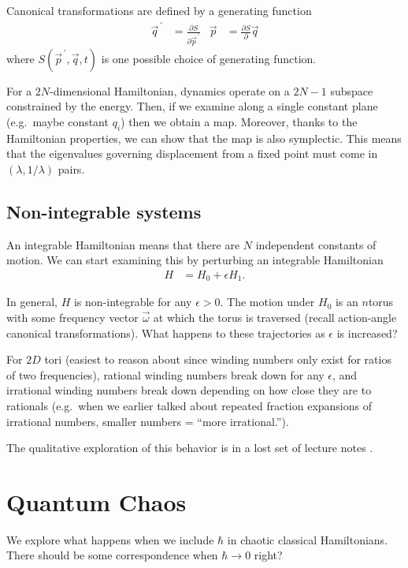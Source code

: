 \documentclass[12pt]{article}
\newcommand{\pd}[2]{\frac{\partial#1}{\partial#2}}
\newcommand{\pvec}[1]{\vec{#1}^{\,\prime}}
\begin{document}
Canonical transformations are defined by a generating function
\begin{align}
    \pvec{q} &= \pd{S}{\pvec{p}}& \vec{p} &= \pd{S}{}\vec{q}
\end{align}
where $S(\pvec{p}, \vec{q}, t)$ is one possible choice of generating function.

For a $2N$-dimensional Hamiltonian, dynamics operate on a $2N-1$ subspace
constrained by the energy. Then, if we examine along a single constant plane
(e.g.\ maybe constant $q_i$) then we obtain a map. Moreover, thanks to the
Hamiltonian properties, we can show that the map is also symplectic. This means
that the eigenvalues governing displacement from a fixed point must come in
$(\lambda, 1/\lambda)$ pairs.

\subsection{Non-integrable systems}

An integrable Hamiltonian means that there are $N$ independent constants of
motion. We can start examining this by perturbing an integrable Hamiltonian
\begin{align}
    H &= H_0 + \epsilon H_1.
\end{align}

In general, $H$ is non-integrable for any $\epsilon > 0$. The motion under $H_0$
is an $n$torus with some frequency vector $\vec{\omega}$ at which the torus is
traversed (recall action-angle canonical transformations). What happens to these
trajectories as $\epsilon$ is increased?

For $2D$ tori (easiest to reason about since winding numbers only exist for
ratios of two frequencies), rational winding numbers break down for any
$\epsilon$, and irrational winding numbers break down depending on how close
they are to rationals (e.g.\ when we earlier talked about repeated fraction
expansions of irrational numbers, smaller numbers = ``more irrational.'').

The qualitative exploration of this behavior is in a lost set of lecture notes
\frownie.

\clearpage

\section{Quantum Chaos}

We explore what happens when we include $\hbar$ in chaotic classical
Hamiltonians. There should be some correspondence when $\hbar \to 0$ right?
\end{document}
